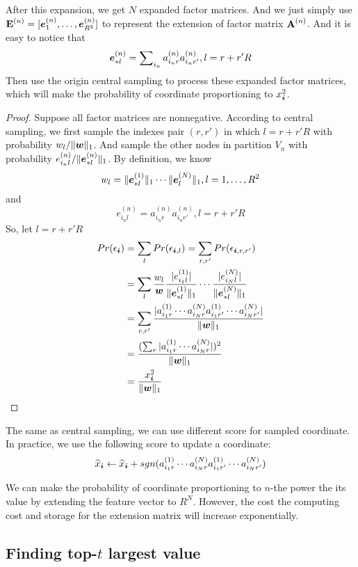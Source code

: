 \documentclass[letterpaper]{article}
\newcommand{\Sca}[3]{{#1}^{(#2)}_{i_#2#3}}%
\newcommand{\V}[1]{{\bm{{\MakeLowercase{#1}}}}}
\newcommand{\VnC}[3]{\V{#1}^{(#2)}_{#3}}
\newcommand{\M}[1]{{\bm{\mathbf{\MakeUppercase{#1}}}}}
\newcommand{\norm}[2]{\|#1\|_{#2}}
\begin{document}
After this expansion, we get $N$ expanded factor matrices. And we just simply use $\M{E}^{(n)}=[\VnC{e}{n}{1},\ldots,\VnC{e}{n}{R^2}]$ to represent the extension of factor matrix $\M{A}^{(n)}$. And it is easy to notice that 
\[
\VnC{e}{n}{*l} = \sum\nolimits_{i_n}\Sca{a}{n}{r}\Sca{a}{n}{r'},l=r+r'R
\]
Then use the origin central  sampling to process these expanded factor matrices, which will make the probability of coordinate proportioning to $x_{\V{i}}^2$.
\begin{proof}
Suppose all factor matrices are nonnegative. According to central sampling, we first sample the indexes pair $(r,r')$ in which $l = r+r'R$ with probability $w_l/\norm{\V{w}}{1}$. And sample the other nodes in partition $V_n$ with probability $e^{(n)}_{i_nl}/\norm{\VnC{e}{n}{*l}}{1}$. By definition, we know
\[
w_l = \norm{\VnC{e}{1}{*l}}{1}\cdots \norm{\VnC{e}{N}{l}}{1}, l = 1,\ldots,R^2
\]
and
\[
e^{(n)}_{i_nl} = \Sca{a}{n}{r}\Sca{a}{n}{r'}, l = r+r'R 
\]
So, let $l = r+r'R$
\begin{align*}
Pr(\epsilon_{\V{i}}) &= \sum_{l} Pr(\epsilon_{\V{i},l})= \sum_{r,r'} Pr(\epsilon_{\V{i},r,r'})\\
&= \sum_{l} \frac{w_l}{\V{w}}
\frac{|e^{(1)}_{i_1l}|}{\norm{\VnC{e}{1}{*l}}{1}}\cdots
\frac{|e^{(N)}_{i_Nl}|}{\norm{\VnC{e}{N}{*l}}{1}}\\
& = \sum_{r,r'} \frac{|\Sca{a}{1}{r}\cdots\Sca{a}{N}{r}\Sca{a}{1}{r'}\cdots\Sca{a}{N}{r'}|}
{\norm{\V{W}}{1}}\\
& = \frac{(\sum_{r}|\Sca{a}{1}{r}\cdots\Sca{a}{N}{r}|)^2}{\norm{\V{W}}{1}}\\
& = \frac{x_{\V{i}}^2}{\norm{\V{w}}{1}}
\end{align*}
\end{proof} 

The same as central sampling, we can use different score for sampled coordinate. In practice, we use the following score to update a coordinate:
\[ 
\widehat{x}_{\V{i}} \leftarrow \widehat{x}_{\V{i}} +sgn(\Sca{a}{1}{r}\cdots\Sca{a}{N}{r}\Sca{a}{1}{r'}\cdots\Sca{a}{N}{r'})
\]

We can make the probability of coordinate proportioning to $n$-the power the its value by extending the feature vector to $R^N$. However, the cost the computing cost and storage for the extension matrix will increase exponentially.


\subsection{Finding top-$t$ largest value}
\end{document}
